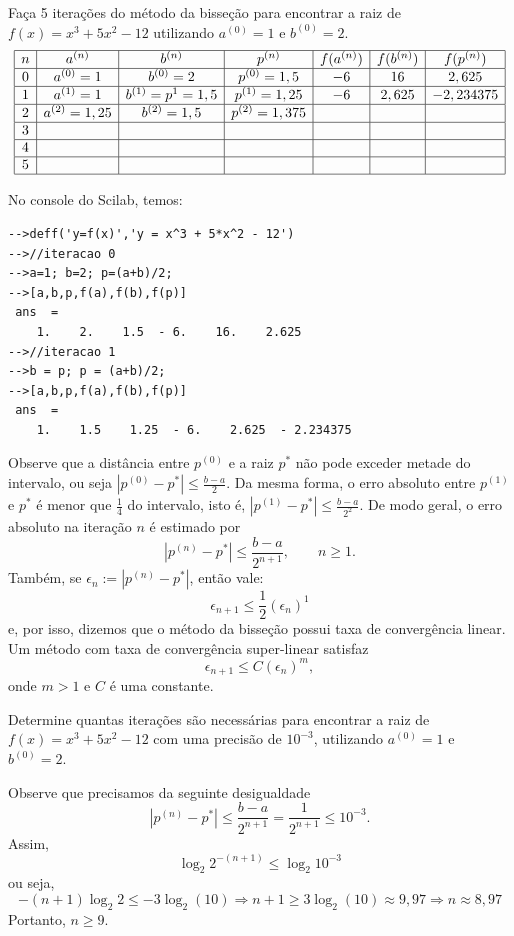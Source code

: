 \documentclass[main.tex]{subfiles}
\begin{document}
\begin{ex}Faça 5 iterações do método da bisseção para encontrar a raiz de $f(x)=x^3+5x^2-12$ utilizando $a^{(0)}=1$ e $b^{(0)}=2$.
$$
\begin{array}{|c|c|c|c|c|c|c|}
\hline
n&a^{(n)}&b^{(n)}&p^{(n)}&f(a^{(n)})&f(b^{(n)})&f(p^{(n)})\\
\hline
0&a^{(0)}=1&b^{(0)}=2&p^{(0)}=1,5&-6 &16&2,625  \\
\hline
1&a^{(1)}=1&b^{(1)}=p^1=1,5&p^{(1)}=1,25&-6 &2,625&-2,234375  \\
\hline
2&a^{(2)}=1,25&b^{(2)}=1,5&p^{(2)}=1,375&&&\\
\hline
3&&&&&&\\
\hline
4&&&&&&\\
\hline
5&&&&&&\\
\hline
\end{array}
$$

\ifisscilab
No console do Scilab, temos:
\begin{verbatim}
-->deff('y=f(x)','y = x^3 + 5*x^2 - 12')
-->//iteracao 0
-->a=1; b=2; p=(a+b)/2;
-->[a,b,p,f(a),f(b),f(p)]
 ans  =
    1.    2.    1.5  - 6.    16.    2.625  
-->//iteracao 1
-->b = p; p = (a+b)/2;
-->[a,b,p,f(a),f(b),f(p)]
 ans  =
    1.    1.5    1.25  - 6.    2.625  - 2.234375
\end{verbatim}
\fi
\end{ex}

Observe que a distância entre $p^{(0)}$ e a raiz $p^*$ não pode exceder metade do intervalo, ou seja $|p^{(0)}-p^*|\leq \frac{b-a}{2}$. Da mesma forma, o erro absoluto entre $p^{(1)}$ e $p^*$ é menor que $\frac{1}{4}$ do intervalo, isto é, $|p^{(1)}-p^*|\leq \frac{b-a}{2^2}$. De modo geral, o erro absoluto na iteração $n$ é estimado por
$$
|p^{(n)}-p^*|\leq \frac{b-a}{2^{n+1}},\qquad n\geq 1.
$$
Também, se $\epsilon_n:=|p^{(n)}-p^*|$, então vale:
$$
\epsilon_{n+1}\leq \frac{1}{2}\left(\epsilon_n\right)^1
$$
e, por isso, dizemos que o método da bisseção possui taxa de convergência linear. Um método com taxa de convergência super-linear satisfaz
$$
\epsilon_{n+1}\leq C\left(\epsilon_n\right)^m,
$$
onde $m>1$ e $C$ é uma constante.

\begin{ex}Determine quantas iterações são necessárias para encontrar a raiz de $f(x)=x^3+5x^2-12$ com uma precisão de $10^{-3}$, utilizando $a^{(0)}=1$ e $b^{(0)}=2$.

Observe que precisamos da seguinte desigualdade
$$
|p^{(n)}-p^*|\leq \frac{b-a}{2^{n+1}}= \frac{1}{2^{n+1}}\leq 10^{-3}.
$$
Assim,
$$
\log_{2}2^{-(n+1)}\leq \log_{2}10^{-3}
$$
ou seja,
$$
-(n+1)\log_{2}2\leq -3\log_2(10)\Rightarrow  n+1\geq 3\log_2(10)\approx 9,97\Rightarrow  n\approx 8,97
$$
Portanto, $n\geq 9$.
\end{ex}
\end{document}
